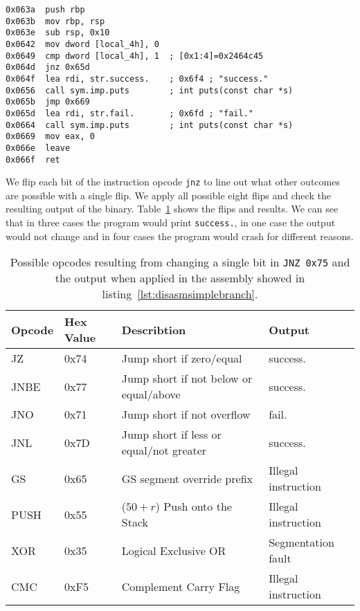 \begin{minipage}{\linewidth}
\begin{lstlisting}[style=nasm,
                   caption={Disassemby of the main function created by the
code in listing~\ref{lst:csimbranch}. Shows machine code at given address
inside the ELF file, starting at \texttt{0x063a}.},
                   label={lst:disasmsimplebranch}]
0x063a  push rbp
0x063b  mov rbp, rsp
0x063e  sub rsp, 0x10
0x0642  mov dword [local_4h], 0
0x0649  cmp dword [local_4h], 1  ; [0x1:4]=0x2464c45
0x064d  jnz 0x65d
0x064f  lea rdi, str.success.    ; 0x6f4 ; "success."
0x0656  call sym.imp.puts        ; int puts(const char *s)
0x065b  jmp 0x669
0x065d  lea rdi, str.fail.       ; 0x6fd ; "fail."
0x0664  call sym.imp.puts        ; int puts(const char *s)
0x0669  mov eax, 0
0x066e  leave
0x066f  ret
\end{lstlisting}
\end{minipage}

We flip each bit of the instruction opcode \texttt{jnz} to line out what other
outcomes are possible with a single flip. We apply all possible eight flips and
check the resulting output of the binary. Table~\ref{tab:jnzflips} shows the
flips and results. We can see that in three cases the program would print
\texttt{success.}, in one case the output would not change and in four cases the
program would crash for different reasons.

\begin{table}[]
\begin{tabular}{|l|l|l|l|}
\hline
Opcode & Hex Value & Describtion                                           &
Output              \\ \hline
JZ     & 0x74      & Jump short if zero/equal                              &
success.            \\ \hline
JNBE   & 0x77      & Jump short if not below or equal/above                &
success.            \\ \hline
JNO    & 0x71      & Jump short if not overflow                            &
fail.               \\ \hline
JNL    & 0x7D      & Jump short if less or equal/not greater               &
success.            \\ \hline
GS     & 0x65      & GS segment override prefix                            &
Illegal instruction \\ \hline
PUSH   & 0x55      & ($50+r$) Push onto the Stack &
Illegal instruction \\ \hline
XOR    & 0x35      & Logical Exclusive OR                                  &
Segmentation fault  \\ \hline
CMC    & 0xF5      & Complement Carry Flag                                 &
Illegal instruction \\ \hline
\end{tabular}
\caption{Possible opcodes resulting from changing a single bit in
\texttt{JNZ}~\texttt{0x75} and the output when applied in the assembly showed in
listing~\ref{lst:disasmsimplebranch}.}
\label{tab:jnzflips}
\end{table}

